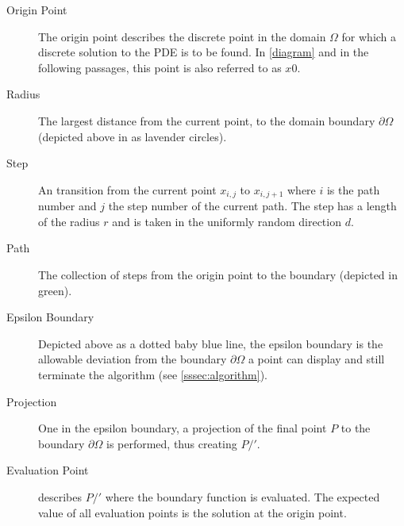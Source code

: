 \begin{description}
\item[Origin Point] The origin point describes the discrete point in the domain
$\Omega$ for which a discrete solution to the PDE is to be found. In \ref{diagram}
and in the following passages, this point is also referred to as $x0$.
\item[Radius] The largest distance from the current point, to the domain boundary
$\partial\Omega$ (depicted above in as lavender circles).
\item[Step] An transition from the current point $x_{i,j}$ to $x_{i,j+1}$ where
$i$ is the path number and $j$ the step number of the current path.  The step has
a length of the radius $r$ and is taken in the uniformly random direction $d$.
\item[Path] The collection of steps from the origin point to the boundary (depicted in green).
\item[Epsilon Boundary] Depicted above as a dotted baby blue line, the epsilon boundary
is the allowable deviation from the boundary $\partial\Omega$ a point can display
and still terminate the algorithm (see \ref{sssec:algorithm}).
\item[Projection] One in the epsilon boundary, a projection of the final point $P$
to the boundary $\partial\Omega$ is performed, thus creating $P/'$.
\item[Evaluation Point] describes $P/'$ where the boundary function is evaluated.
The expected value of all evaluation points is the solution at the origin point.
\end{description}

